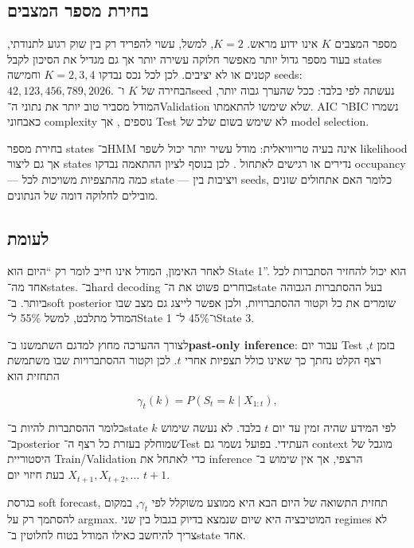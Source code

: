 \subsection{בחירת מספר המצבים}

מספר המצבים \(K\) אינו ידוע מראש. \(K=2\), למשל, עשוי להפריד רק בין שוק רגוע לתנודתי, בעוד מספר גדול יותר מאפשר חלוקה עשירה יותר אך גם מגדיל את הסיכון לקבל states קטנים או לא יציבים. לכן לכל נכס נבדקו \(K=2,3,4\) וחמישה seeds: \(42,123,456,789,2026\). הבחירה של \(K\) ו־seed נעשתה לפי  בלבד: ככל שהערך גבוה יותר, המודל מסביר טוב יותר את נתוני ה־Validation שלא שימשו להתאמתו. AIC ו־BIC נשמרו כאבחוני complexity נוספים \cite{akaike1974new,schwarz1978estimating}, אך Test לא שימש בשום שלב של model selection.

בחירת מספר states ב־HMM אינה בעיה טריוויאלית: מודל עשיר יותר יכול לשפר likelihood אך גם ליצור states נדירים או רגישים לאתחול \cite{pohle2017selecting}. לכן בנוסף לציון ההתאמה נבדקו occupancy — כמה מהתצפיות משויכות לכל state — ויציבות בין seeds, כלומר האם אתחולים שונים מובילים לחלוקה דומה של הנתונים.

\subsection{ לעומת }

לאחר האימון, המודל אינו חייב לומר רק ``היום הוא State 1''. הוא יכול להחזיר הסתברות לכל אחד מה־states. ב־hard decoding בוחרים פשוט את ה־state בעל ההסתברות הגבוהה ביותר. ב־soft posterior שומרים את כל וקטור ההסתברויות, ולכן אפשר לייצג גם מצב שבו המודל מתלבט, למשל 55\% ל־State 1 ו־45\% ל־State 3.

לצורך ההערכה מחוץ למדגם השתמשנו ב־\textbf{past-only inference}: עבור יום Test בזמן \(t\), רצף הקלט נחתך כך שאינו כולל תצפיות אחרי \(t\). לכן וקטור ההסתברויות שבו משתמשת התחזית הוא

\begin{equation}
\gamma_t(k)=P(S_t=k\mid X_{1:t}),
\end{equation}

כלומר ההסתברות להיות ב־state \(k\) לפי המידע שהיה זמין עד יום \(t\) בלבד. לא נעשה שימוש ב־posterior שמוחלק בעזרת כל רצף ה־Test העתידי. בפועל נשמר גם context מוגבל של היסטוריית Train/Validation כדי לאתחל את inference הרצפי, אך אין שימוש ב־\(X_{t+1},X_{t+2},\ldots\) בעת חיזוי יום \(t+1\).

בגרסת soft forecast, תחזית התשואה של היום הבא היא ממוצע משוקלל לפי \(\gamma_t\), במקום להסתמך רק על argmax. המוטיבציה היא שיום שנמצא בדיוק בגבול בין שני regimes לא צריך להיחשב כאילו המודל בטוח לחלוטין ב־state אחד.

